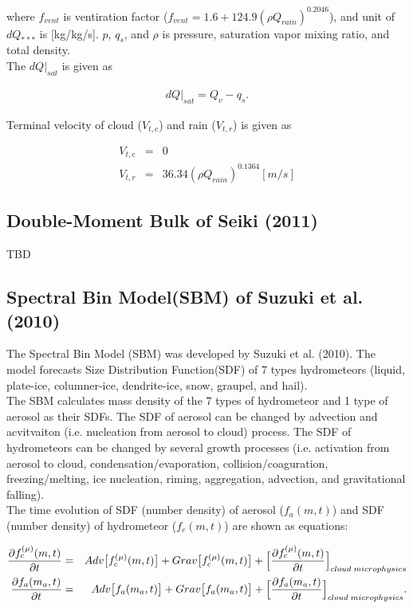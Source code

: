 where $f_{vent}$ is ventiration factor ($f_{vent}=1.6+124.9(\rho Q_{rain})^{0.2046}$), and unit of $dQ_{***}$ is [kg/kg/s]. $p$, $q_{s}$, and $\rho$ is pressure, saturation vapor mixing ratio, and total density.\\
The $dQ|_{sat}$ is given as

\begin{eqnarray}
dQ|_{sat}=Q_{v}-q_{s}.
\end{eqnarray}

Terminal velocity of cloud ($V_{t,c}$) and rain ($V_{t,r}$) is given as

\begin{eqnarray}
V_{t,c}&=&0\\
V_{t,r}&=&36.34(\rho Q_{rain})^{0.1364} [m/s]
\end{eqnarray} 



\subsection{Double-Moment Bulk of Seiki (2011)}
{\Huge TBD}

\subsection{Spectral Bin Model(SBM) of Suzuki et al. (2010)}
The Spectral Bin Model (SBM) was developed by Suzuki et al. (2010). The model forecasts Size Distribution Function(SDF) of 7 types hydrometeors (liquid, plate-ice, columner-ice, dendrite-ice, snow, graupel, and hail). \\
The SBM calculates mass density of the 7 types of hydrometeor and 1 type of aerosol as their SDFs. The SDF of aerosol can be changed by advection and acvitvaiton (i.e. nucleation from aerosol to cloud) process. The SDF of hydrometeors can be changed by several growth processes (i.e. activation from aerosol to cloud, condensation/evaporation, collision/coaguration, freezing/melting, ice nucleation, riming, aggregation, advection, and gravitational falling). \\
The time evolution of SDF (number density) of aerosol ($f_{a}(m,t)$) and SDF (number density) of hydrometeor ($f_{c}(m,t)$) are shown as equations:

\begin{eqnarray}
\frac{\partial f^{(\mu)}_{c}(m,t)}{\partial t}&=&Adv\bigl[f^{(\mu)}_{c}(m,t)\bigr]+Grav\bigl[f^{(\mu)}_{c}(m,t)\bigr]+\Bigl[ \frac{\partial f^{(\mu)}_{c}(m,t)}{\partial t}\Bigr ]_{cloud\;microphysics}\\
\frac{\partial f_{a}(m_{a},t)}{\partial t}&=&Adv\bigl[f_{a}(m_{a},t)\bigr]+Grav\bigl[f_{a}(m_{a},t)\bigr]+\Bigl[ \frac{\partial f_{a}(m_{a},t)}{\partial t} \Bigr ]_{cloud\;microphysics}.
\end{eqnarray} 


